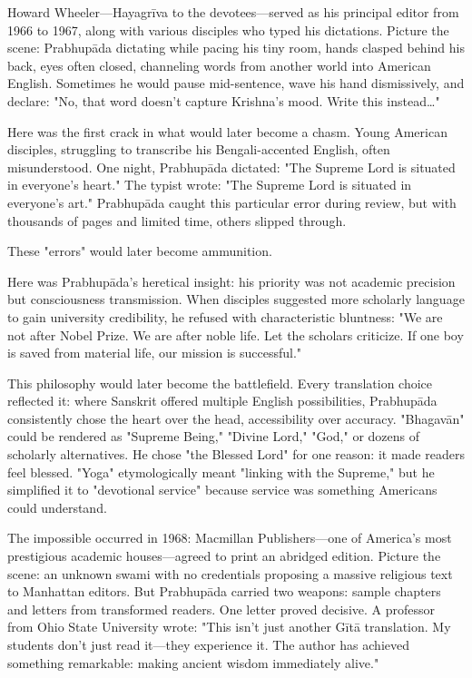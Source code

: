 \documentclass[12pt,twoside]{book}
\begin{document}
Howard Wheeler—Hayagrīva to the devotees—served as his principal editor from 1966 to 1967, along with various disciples who typed his dictations. Picture the scene: Prabhupāda dictating while pacing his tiny room, hands clasped behind his back, eyes often closed, channeling words from another world into American English. Sometimes he would pause mid-sentence, wave his hand dismissively, and declare: "No, that word doesn't capture Krishna's mood. Write this instead\ldots{}"

Here was the first crack in what would later become a chasm. Young American disciples, struggling to transcribe his Bengali-accented English, often misunderstood. One night, Prabhupāda dictated: "The Supreme Lord is situated in everyone's heart." The typist wrote: "The Supreme Lord is situated in everyone's art." Prabhupāda caught this particular error during review, but with thousands of pages and limited time, others slipped through.

These "errors" would later become ammunition.

Here was Prabhupāda's heretical insight: his priority was not academic precision but consciousness transmission. When disciples suggested more scholarly language to gain university credibility, he refused with characteristic bluntness: "We are not after Nobel Prize. We are after noble life. Let the scholars criticize. If one boy is saved from material life, our mission is successful."

This philosophy would later become the battlefield. Every translation choice reflected it: where Sanskrit offered multiple English possibilities, Prabhupāda consistently chose the heart over the head, accessibility over accuracy. "Bhagavān" could be rendered as "Supreme Being," "Divine Lord," "God," or dozens of scholarly alternatives. He chose "the Blessed Lord" for one reason: it made readers feel blessed. "Yoga" etymologically meant "linking with the Supreme," but he simplified it to "devotional service" because service was something Americans could understand.

The impossible occurred in 1968: Macmillan Publishers—one of America's most prestigious academic houses—agreed to print an abridged edition. Picture the scene: an unknown swami with no credentials proposing a massive religious text to Manhattan editors. But Prabhupāda carried two weapons: sample chapters and letters from transformed readers. One letter proved decisive. A professor from Ohio State University wrote: "This isn't just another Gītā translation. My students don't just read it—they experience it. The author has achieved something remarkable: making ancient wisdom immediately alive."
\end{document}
